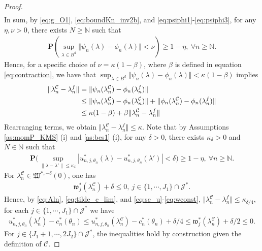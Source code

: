 \documentclass[letterpaper,11pt]{article}
\theoremstyle{myplain}
\theoremstyle{mydefinition}
\theoremstyle{myremark}
\newcommand{\cC}{\mathcal{C}}
\newcommand{\cJ}{\mathcal{J}}
\numberwithin{equation}{section}
\numberwithin{figure}{section}
\begin{document}
\begin{appendices}
\begin{proof}
\begin{align}
\end{align}
In sum, by \eqref{eq:g_O1}, \eqref{eq:boundKn_inv2b}, and \eqref{eq:psiphi1}-\eqref{eq:psiphi3}, for any $\eta,\nu>0$, there exists $N\ge\mathbb N$ such that
\begin{align}
\mathbf{P}\left(\sup_{\lambda \in B^d}\Vert \psi_{n}(\lambda) -\phi_{n}(\lambda)\Vert<\nu\right)\ge 1-\eta,~\forall n\ge \mathbb N.\label{eq:unif_conv_phi}
\end{align}  
Hence, for a specific choice of $\nu=\kappa(1-\beta)$, where $\beta$ is defined in equation \eqref{eq:contraction}, we have that $\sup_{\lambda \in B^d}\Vert \psi_{n}(\lambda) -\phi_{n}(\lambda)\Vert<\kappa(1-\beta)$ implies
\begin{align}
\Vert \lambda^{\cC}_{n} - \lambda^f_{n} \Vert &= \Vert \psi_{n}(\lambda^{\cC}_{n}) -\phi_{n}(\lambda^f_{n})\Vert\notag\\
&\le \Vert \psi_{n}(\lambda^{\cC}_{n}) -\phi_{n}(\lambda^{\cC}_{n})\Vert+\Vert \phi_{n}(\lambda^{\cC}_{n}) -\phi_{n}(\lambda^f_{n})\Vert\notag\\
&\le \kappa(1-\beta) + \beta \Vert \lambda^{\cC}_{n} - \lambda^f_{n} \Vert
\end{align}
Rearranging terms, we obtain $\Vert \lambda^{\cC}_{n} - \lambda^f_{n} \Vert \le \kappa$. 
Note that by Assumptions \ref{as:momP_KMS} (i) and \ref{as:bcs1} (i),  for any $\delta>0$, there exists $\kappa_\delta>0$ and $N\in\mathbb N$ such that 
\begin{align}
\mathbf P\Big(\sup_{\|\lambda-\lambda'\|\le \kappa_\delta}	|u^*_{n,j,\theta_{n}}(\lambda)-u^*_{n,j,\theta_{n}}(\lambda')|<\delta\Big)\ge 1-\eta,~\forall n\ge \mathbb N.	\label{eq:se_u}
\end{align}
For $\lambda^{\cC}_{n}\in \mathfrak W^{*,-\delta}(0)$, one has
\begin{align}
	\mathfrak w^*_{j}(\lambda^{\cC}_{n})+\delta\le 0,~j \in \{1,\cdots, J_1\} \cap \cJ^*.\label{eq:wconst}
\end{align}
Hence, by \eqref{eq:Aln}, \eqref{eq:tilde_c_lim}, and \eqref{eq:se_u}-\eqref{eq:wconst}, $\Vert \lambda^{\cC}_{n} - \lambda^f_{n} \Vert \le \kappa_{\delta/4}$, for each $j \in \{1,\cdots, J_1\} \cap \cJ^*$ we have
\begin{align}
	u^*_{n,j,\theta_{n}}(\lambda^f_{n})-c^{*}_{n}(\theta_n)\le u^*_{n,j,\theta_{n}}(\lambda^{\cC}_{n})-c^{*}_{n}(\theta_n)+\delta/4 \le \mathfrak w^*_{j}(\lambda^{\cC}_{n})+\delta/2 \le 0.
\end{align}
For $j \in \{J_1+1,\cdots, 2J_2\} \cap \cJ^*$, the inequalities hold by construction given the definition of ${\cC}$.


\end{proof}
\end{appendices}
\end{document}
